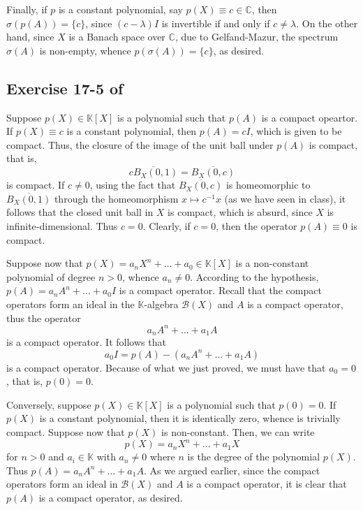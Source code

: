 \documentclass[10pt]{amsart}
\theoremstyle{thmstyle}
\theoremstyle{defstyle}
\newcommand{\bbC}{\mathbb{C}}
\newcommand{\K}{\mathbb{K}}
\newcommand{\scrB}{\mathscr B}
\begin{document}
Finally, if $p$ is a constant polynomial, say $p(X) \equiv c\in\bbC$, then $\sigma(p(A)) = \{c\}$, since $(c - \lambda)I$ is invertible if and only if $c\ne\lambda$. On the other hand, since $X$ is a Banach space over $\bbC$, due to Gelfand-Mazur, the spectrum $\sigma(A)$ is non-empty, whence $p(\sigma(A)) = \{c\}$, as desired.


\subsection*{Exercise 17-5 of \texorpdfstring{\cite{limaye-functional}}{[Lim14]}}

Suppose $p(X)\in\K[X]$ is a polynomial such that $p(A)$ is a compact opeartor. If $p(X)\equiv c$ is a constant polynomial, then $p(A) = cI$, which is given to be compact. Thus, the closure of the image of the unit ball under $p(A)$ is compact, that is,
\begin{equation*}
    \overline{cB_X(0, 1)} = \overline{B_X(0, c)} 
\end{equation*}
is compact. If $c\ne 0$, using the fact that $\overline{B_X(0, c)}$ is homeomorphic to $\overline{B_X(0, 1)}$ through the homeomorphism $x\mapsto c^{-1}x$ (as we have seen in class), it follows that the closed unit ball in $X$ is compact, which is absurd, since $X$ is infinite-dimensional. Thus $c = 0$. Clearly, if $c = 0$, then the operator $p(A)\equiv 0$ is compact.

Suppose now that $p(X) = a_nX^n + \dots + a_0\in\K[X]$ is a non-constant polynomial of degree $n > 0$, whence $a_n\ne 0$. According to the hypothesis, $p(A) = a_nA^n + \dots + a_0I$ is a compact operator. Recall that the compact operators form an ideal in the $\K$-algebra $\scrB(X)$ and $A$ is a compact operator, thus the operator 
\begin{equation*}
    a_nA^n + \dots + a_1A
\end{equation*}
is a compact operator. It follows that 
\begin{equation*}
    a_0I = p(A) - \left(a_nA^n + \dots + a_1A\right) 
\end{equation*}
is a compact operator. Because of what we just proved, we must have that $a_0 = 0$, that is, $p(0) = 0$.

Conversely, suppose $p(X)\in\K[X]$ is a polynomial such that $p(0) = 0$. If $p(X)$ is a constant polynomial, then it is identically zero, whence is trivially compact. Suppose now that $p(X)$ is non-constant. Then, we can write 
\begin{equation*}
    p(X) = a_nX^n + \dots + a_1X
\end{equation*}
for $n > 0$ and $a_i\in\K$ with $a_n\ne 0$ where $n$ is the degree of the polynomial $p(X)$. Thus $p(A) = a_nA^n + \dots + a_1A$. As we argued earlier, since the compact operators form an ideal in $\scrB(X)$ and $A$ is a compact operator, it is clear that $p(A)$ is a compact operator, as desired.



\end{document}
